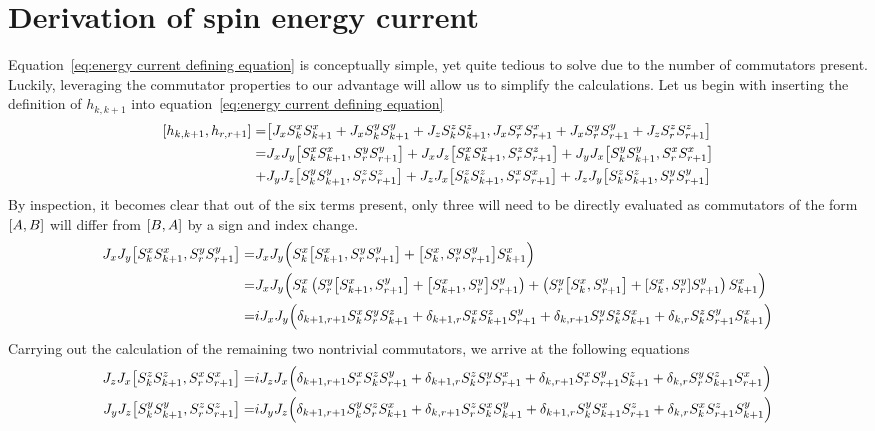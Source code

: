 \chapter{Derivation of spin energy current\label{app:spin energy current derivation}}
\thispagestyle{chapterBeginStyle}

Equation~\eqref{eq:energy current defining equation} is
conceptually simple, yet quite tedious to solve due to the number of commutators present. Luckily, leveraging the commutator properties
to our advantage will allow us to simplify the calculations. Let us begin with inserting the definition of \(h_{k,k+1}\) into 
equation~\eqref{eq:energy current defining equation}
\begin{align*}
    \comm{h_{k,k+1}}{h_{r,r+1}} =& \comm{J_{x} \Sx_{k}\Sx_{k+1} + J_{x} \Sy_{k}\Sy_{k+1} + J_{z} \Sz_{k}\Sz_{k+1}}{J_{x} \Sx_{r}\Sx_{r+1} + J_{x} \Sy_{r}\Sy_{r+1} + J_{z} \Sz_{r}\Sz_{r+1}}\\
    =& J_{x} J_{y}\comm{\Sx_{k}\Sx_{k+1}}{\Sy_{r}\Sy_{r+1}} + J_{x} J_{z}\comm{\Sx_{k}\Sx_{k+1}}{\Sz_{r}\Sz_{r+1}} + J_{y} J_{x}\comm{\Sy_{k}\Sy_{k+1}}{\Sx_{r}\Sx_{r+1}}\\
    +& J_{y} J_{z}\comm{\Sy_{k}\Sy_{k+1}}{\Sz_{r}\Sz_{r+1}} + J_{z} J_{x}\comm{\Sz_{k}\Sz_{k+1}}{\Sx_{r}\Sx_{r+1}} + J_{z} J_{y}\comm{\Sz_{k}\Sz_{k+1}}{\Sy_{r}\Sy_{r+1}}  
\end{align*}
By inspection, it becomes clear that out of the six terms present, only three will need to be directly evaluated as commutators of the form
\(\comm{A}{B}\) will differ from \(\comm{B}{A}\) by a sign and index change.
\begin{align*}
    J_{x} J_{y}\comm{\Sx_{k}\Sx_{k+1}}{\Sy_{r}\Sy_{r+1}} =& J_x J_y \Big(\Sx_k\comm{\Sx_{k+1}}{\Sy_{r}\Sy_{r+1}} + \comm{\Sx_{k}}{\Sy_{r}\Sy_{r+1}} \Sx_{k+1} \Big)\\
    =& J_x J_y \Big( \Sx_k \left( \Sy_r \comm{\Sx_{k+1}}{\Sy_{r+1}} + \comm{\Sx_{k+1}}{\Sy_{r}} \Sy_{r+1}\right) + 
    \left( \Sy_r \comm{\Sx_{k}}{\Sy_{r+1}} + \comm{\Sx_{k}}{\Sy_{r}} \Sy_{r+1} \right)\Sx_{k+1} \Big)\\
    =& i J_x J_y \Big( \delta_{k+1,r+1} \Sx_k \Sy_r \Sz_{k+1} + \delta_{k+1,r} \Sx_k \Sz_{k+1} \Sy_{r+1} + \delta_{k,r+1} \Sy_r \Sz_k \Sx_{k+1} +\delta_{k,r} \Sz_k \Sy_{r+1} \Sx_{k+1}\Big)
\end{align*}
Carrying out the calculation of the remaining two nontrivial commutators, we arrive at the following equations
\begin{align*}
    J_{z} J_{x}\comm{\Sz_{k}\Sz_{k+1}}{\Sx_{r}\Sx_{r+1}} =& i J_z J_x \Big( \delta_{k+1,r+1} \Sx_r \Sz_k \Sy_{r+1} + \delta_{k+1,r} \Sz_k \Sy_{r} \Sx_{r+1} + \delta_{k,r+1} \Sx_r \Sy_{r+1} \Sz_{k+1} +\delta_{k,r} \Sy_r \Sz_{k+1} \Sx_{r+1}\Big)\\ 
    J_{y} J_{z}\comm{\Sy_{k}\Sy_{k+1}}{\Sz_{r}\Sz_{r+1}} =& i J_y J_z \Big( \delta_{k+1,r+1} \Sy_k \Sz_r \Sx_{k+1} + \delta_{k,r+1} \Sz_r \Sx_{k} \Sy_{k+1} + \delta_{k+1,r} \Sy_k \Sx_{k+1} \Sz_{r+1} +\delta_{k,r} \Sx_k \Sz_{r+1} \Sy_{k+1}\Big) 
\end{align*}

